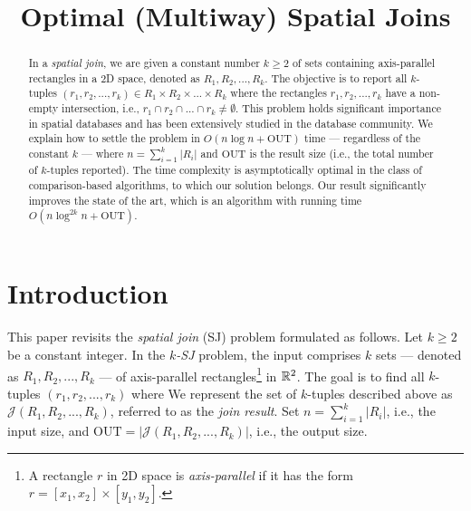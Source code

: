 \documentclass[sigconf]{acmart}
\def\J{\mathcal{J}}
\def\out{\mathrm{OUT}}
\begin{document}
    
\title{Optimal (Multiway) Spatial Joins}


\author{}


\begin{abstract}
    In a {\em spatial join}, we are given a constant number $k \geq 2$ of sets containing axis-parallel rectangles in a 2D space, denoted as $R_1, R_2, ..., R_k$. The objective is to report all $k$-tuples $(r_1, r_2, ..., r_k) \in R_1 \times R_2 \times ... \times R_k$ where the rectangles $r_1, r_2, ..., r_k$ have a non-empty intersection, i.e., $r_1 \cap r_2 \cap ... \cap r_k \neq \emptyset$. This problem holds significant importance in spatial databases and has been extensively studied in the database community. We explain how to settle the problem in $O(n \log n + \out)$ time --- regardless of the constant $k$ --- where $n = \sum_{i=1}^k |R_i|$ and $\out$ is the result size (i.e., the total number of $k$-tuples reported). The time complexity is asymptotically optimal in the class of comparison-based algorithms, to which our solution belongs. Our result significantly improves the state of the art, which is an algorithm with running time $O(n \log^{2k} n + \out)$.
\end{abstract}

\maketitle 

\section{Introduction} \label{sec:intro}

This paper revisits the {\em spatial join} (SJ) problem formulated as follows. Let $k \ge 2$ be a constant integer. In the {\em $k$-SJ} problem, the input comprises $k$ sets --- denoted as $R_1, R_2, ..., R_k$ --- of axis-parallel rectangles\footnote{A rectangle $r$ in 2D space is {\em axis-parallel} if it has the form $r = [x_1, x_2] \times [y_1, y_2]$.} in $\mathbb{R}^2$. The goal is to find all $k$-tuples $(r_1, r_2, ..., r_k)$ where
We represent the set of $k$-tuples described above as $\J(R_1, R_2, ..., R_k)$, referred to as the {\em join result}. Set $n = \sum_{i=1}^k |R_i|$, i.e., the input size, and $\out = |\J(R_1, R_2, ..., R_k)|$, i.e., the output size.
\end{document}
